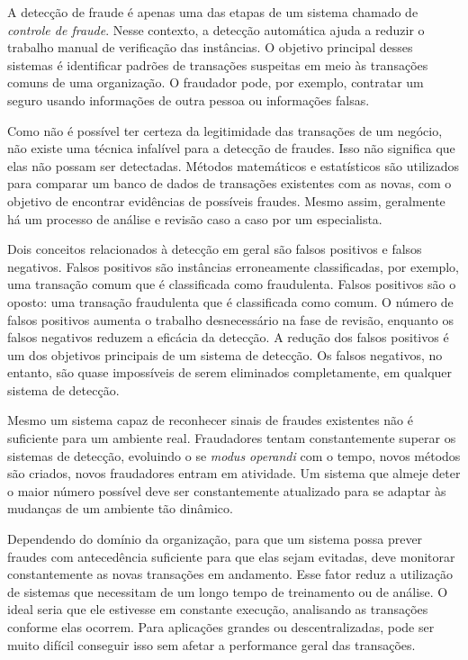 A detecção de fraude é apenas uma das etapas de um sistema chamado de \emph{controle de fraude}. Nesse contexto, a detecção automática ajuda a reduzir o trabalho manual de verificação das instâncias. O objetivo principal desses sistemas é identificar padrões de transações suspeitas em meio às transações comuns de uma organização. O fraudador pode, por exemplo, contratar um seguro usando informações de outra pessoa ou informações falsas.

Como não é possível ter certeza da legitimidade das transações de um negócio, não existe uma técnica infalível para a detecção de fraudes. Isso não significa que elas não possam ser detectadas. Métodos matemáticos e estatísticos são utilizados para comparar um banco de dados de transações existentes com as novas, com o objetivo de encontrar evidências de possíveis fraudes. Mesmo assim, geralmente há um processo de análise e revisão caso a caso por um especialista.

Dois conceitos relacionados à detecção em geral são falsos positivos e falsos negativos. Falsos positivos são instâncias erroneamente classificadas, por exemplo, uma transação comum que é classificada como fraudulenta. Falsos positivos são o oposto: uma transação fraudulenta que é classificada como comum. O número de falsos positivos aumenta o trabalho desnecessário na fase de revisão, enquanto os falsos negativos reduzem a eficácia da detecção. A redução dos falsos positivos é um dos objetivos principais de um sistema de detecção. Os falsos negativos, no entanto, são quase impossíveis de serem eliminados completamente, em qualquer sistema de detecção.

Mesmo um sistema capaz de reconhecer sinais de fraudes existentes não é suficiente para um ambiente real. Fraudadores tentam constantemente superar os sistemas de detecção, evoluindo o se \emph{modus operandi} com o tempo, novos métodos são criados, novos fraudadores entram em atividade. Um sistema que almeje deter o maior número possível deve ser constantemente atualizado para se adaptar às mudanças de um ambiente tão dinâmico.

Dependendo do domínio da organização, para que um sistema possa prever fraudes com antecedência suficiente para que elas sejam evitadas, deve monitorar constantemente as novas transações em andamento. Esse fator reduz a utilização de sistemas que necessitam de um longo tempo de treinamento ou de análise. O ideal seria que ele estivesse em constante execução, analisando as transações conforme elas ocorrem. Para aplicações grandes ou descentralizadas, pode ser muito difícil conseguir isso sem afetar a performance geral das transações.

